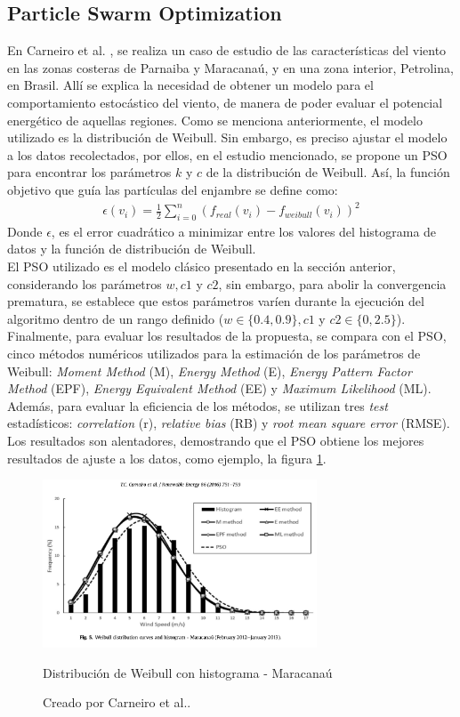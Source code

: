  \subsection{Particle Swarm Optimization}
 En Carneiro et al. \cite{Carneiro15}, se realiza un caso de estudio de las características del viento en las zonas costeras de Parnaiba y Maracanaú, y en una zona interior, Petrolina, en Brasil. Allí se explica la necesidad de obtener un modelo para el comportamiento estocástico del viento, de manera de poder evaluar el potencial energético de aquellas regiones. Como se menciona anteriormente, el modelo utilizado es la distribución de Weibull. Sin embargo, es preciso ajustar el modelo a los datos recolectados, por ellos, en el estudio mencionado, se propone un PSO para encontrar los parámetros $k$ y $c$ de la distribución de Weibull. Así, la función objetivo que guía las partículas del enjambre se define como:
\begin{align}
    \epsilon(v_i) = \frac{1}{2}\sum_{i=0}^{n}(f_{real}(v_i) - f_{weibull}(v_i))^2
\end{align}
Donde $\epsilon$, es el error cuadrático a minimizar entre los valores del histograma de datos y la función de distribución de Weibull.\\
El PSO utilizado es el modelo clásico presentado en la sección anterior, considerando los parámetros $w, c1$ y $c2$, sin embargo, para abolir la convergencia prematura, se establece que estos parámetros varíen durante la ejecución del algoritmo dentro de un rango definido ($w \in \{0.4, 0.9\}, c1$ y $c2 \in \{0, 2.5\}$).\\
Finalmente, para evaluar los resultados de la propuesta, se compara con el PSO, cinco métodos numéricos utilizados para la estimación de los parámetros de Weibull: \emph{Moment Method} (M), \emph{Energy Method} (E), \emph{Energy Pattern Factor Method} (EPF), \emph{Energy Equivalent Method} (EE) y \emph{Maximum Likelihood} (ML). Además, para evaluar la eficiencia de los métodos, se utilizan tres \emph{test} estadísticos: \emph{correlation} (r), \emph{relative bias} (RB) y \emph{root mean square error} (RMSE).\\
Los resultados son alentadores, demostrando que el PSO obtiene los mejores resultados de ajuste a los datos, como ejemplo, la figura \ref{fig:pso_fit}.
\begin{figure}[h!]
    \centering    
    \includegraphics[height=50mm]{figures/pso_fit.png} 
    \caption{Distribución de Weibull con histograma - Maracanaú}
    \vspace{-.25cm} 
    \caption*{Creado por Carneiro et al.\cite{Carneiro15}.}
    \label{fig:pso_fit}
\end{figure}
